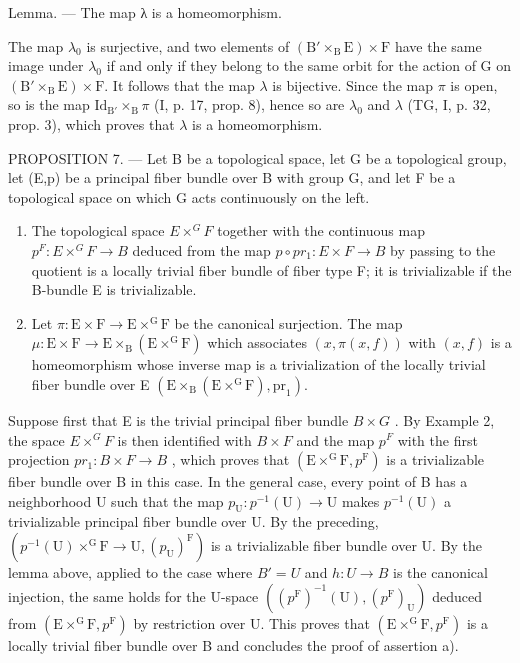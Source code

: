 Lemma. --- The map λ is a homeomorphism.

The map \(\lambda_0\) is surjective, and two elements of \((\mathrm{B}' \times_{\mathrm{B}} \mathrm{E}) \times \mathrm{F}\) have the same image under \(\lambda_0\) if and only if they belong to the same orbit for the action of G on \((\mathrm{B}' \times_{\mathrm{B}} \mathrm{E}) \times \mathrm{F}\). It follows that the map \(\lambda\) is bijective. Since the map \(\pi\) is open, so is the map \(\mathrm{Id}_{\mathrm{B}'} \times_{\mathrm{B}} \pi\) (I, p. 17, prop. 8), hence so are \(\lambda_0\) and \(\lambda\) (TG, I, p. 32, prop. 3), which proves that \(\lambda\) is a homeomorphism.

PROPOSITION 7. --- Let B be a topological space, let G be a topological group, let (E,p) be a principal fiber bundle over B with group G, and let F be a topological space on which G acts continuously on the left.

\begin{enumerate}
\def\labelenumi{\alph{enumi})}
\item
  The topological space \(E \times^{G} F\) together with the continuous map \(p^{F}: E \times^{G} F \to B\) deduced from the map \(p \circ pr_{1}: E \times F \to B\) by passing to the quotient is a locally trivial fiber bundle of fiber type F; it is trivializable if the B-bundle E is trivializable.
\item
  Let \(\pi\colon\mathrm{E}\times\mathrm{F}\to\mathrm{E}\times^{\mathrm{G}}\mathrm{F}\) be the canonical surjection. The map \(\mu\colon\mathrm{E}\times\mathrm{F}\to\mathrm{E}\times_{\mathrm{B}}(\mathrm{E}\times^{\mathrm{G}}\mathrm{F})\) which associates \((x,\pi(x,f))\) with \((x,f)\) is a homeomorphism whose inverse map is a trivialization of the locally trivial fiber bundle over E \((\mathrm{E}\times_{\mathrm{B}}(\mathrm{E}\times^{\mathrm{G}}\mathrm{F}),\mathrm{pr}_{1})\).
\end{enumerate}

Suppose first that E is the trivial principal fiber bundle \(B \times G\) . By Example 2, the space \(E \times^{G} F\) is then identified with \(B \times F\) and the map \(p^{F}\) with the first projection \(pr_{1}: B \times F \to B\) , which proves that \((\mathrm{E} \times^{\mathrm{G}}\mathrm{F}, p^{\mathrm{F}})\) is a trivializable fiber bundle over B in this case. In the general case, every point of B has a neighborhood U such that the map \(p_{\mathrm{U}}: p^{-1}(\mathrm{U}) \to \mathrm{U}\) makes \(p^{-1}(\mathrm{U})\) a trivializable principal fiber bundle over U. By the preceding, \((p^{-1}(\mathrm{U}) \times^{\mathrm{G}}\mathrm{F} \to \mathrm{U}, (p_{\mathrm{U}})^{\mathrm{F}})\) is a trivializable fiber bundle over U. By the lemma above, applied to the case where \(B' = U\) and \(h: U \to B\) is the canonical injection, the same holds for the U-space \(((p^{\mathrm{F}})^{-1}(\mathrm{U}), (p^{\mathrm{F}})_{\mathrm{U}})\) deduced from \((\mathrm{E} \times^{\mathrm{G}}\mathrm{F}, p^{\mathrm{F}})\) by restriction over U. This proves that \((\mathrm{E} \times^{\mathrm{G}}\mathrm{F}, p^{\mathrm{F}})\) is a locally trivial fiber bundle over B and concludes the proof of assertion a).

